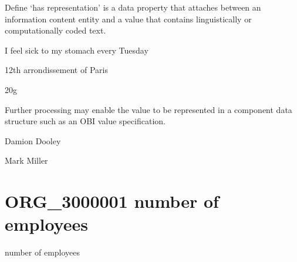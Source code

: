 \documentclass[letterpaper,10pt,english]{sphinxmanual}
\begin{document}
\begin{sphinxShadowBox}

\sphinxAtStartPar
Define ‘has representation’ is a data property that attaches between an information content entity and a value that contains linguistically or computationally coded text.
\end{sphinxShadowBox}

\begin{sphinxShadowBox}

\sphinxAtStartPar
I feel sick to my stomach every Tuesday

\sphinxAtStartPar
12th arrondissement of Paris

\sphinxAtStartPar
20g
\end{sphinxShadowBox}

\begin{sphinxShadowBox}

\sphinxAtStartPar
Further processing may enable the value to be represented in a component data structure such as an OBI value specification.
\end{sphinxShadowBox}

\begin{sphinxShadowBox}

\sphinxAtStartPar
{}
\end{sphinxShadowBox}

\begin{sphinxShadowBox}

\sphinxAtStartPar
Damion Dooley

\sphinxAtStartPar
Mark Miller
\end{sphinxShadowBox}
\begin{quote}

\ignorespaces \end{quote}


\section{ORG\_3000001 \sphinxhyphen{} number of employees}
\label{\detokenize{doc-ORG_3000001:org-3000001-number-of-employees}}\label{\detokenize{doc-ORG_3000001:index-0}}\label{\detokenize{doc-ORG_3000001::doc}}
\begin{sphinxShadowBox}

\sphinxAtStartPar
number of employees
\end{sphinxShadowBox}
\end{document}
